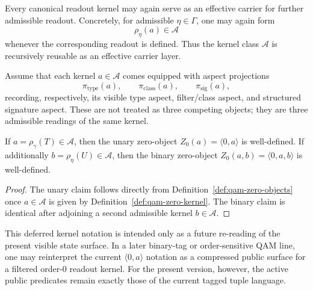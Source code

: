 \begin{axiom}\label{ax:qam-zero-recursive}
Every canonical readout kernel may again serve as an effective carrier for further admissible readout. Concretely, for admissible $\eta\in\Gamma$, one may again form
\[
\rho_\eta(a)\in\mathcal A
\]
whenever the corresponding readout is defined. Thus the kernel class $\mathcal A$ is recursively reusable as an effective carrier layer.
\end{axiom}

\begin{definition}\label{def:qam-kernel-aspects}
Assume that each kernel $a\in\mathcal A$ comes equipped with aspect projections
\[
\pi_{\mathrm{type}}(a),\qquad
\pi_{\mathrm{class}}(a),\qquad
\pi_{\mathrm{sig}}(a),
\]
recording, respectively, its visible type aspect, filter/class aspect, and structured signature aspect. These are not treated as three competing objects; they are three admissible readings of the same kernel.
\end{definition}

\begin{lemma}\label{lem:qam-zero-collapse}
If $a=\rho_\gamma(T)\in\mathcal A$, then the unary zero-object $Z_0(a)=\langle 0,a\rangle$ is well-defined. If additionally $b=\rho_\eta(U)\in\mathcal A$, then the binary zero-object $Z_0(a,b)=\langle 0,a,b\rangle$ is well-defined.
\end{lemma}

\begin{proof}
The unary claim follows directly from Definition~\ref{def:qam-zero-objects} once $a\in\mathcal A$ is given by Definition~\ref{def:qam-zero-kernel}. The binary claim is identical after adjoining a second admissible kernel $b\in\mathcal A$.
\end{proof}

\begin{remark}\label{rem:qam-zero-compressed}
This deferred kernel notation is intended only as a future re-reading of the present visible state surface. In a later binary-tag or order-sensitive QAM line, one may reinterpret the current $\langle 0,a\rangle$ notation as a compressed public surface for a filtered order-$0$ readout kernel. For the present version, however, the active public predicates remain exactly those of the current tagged tuple language.
\end{remark}

